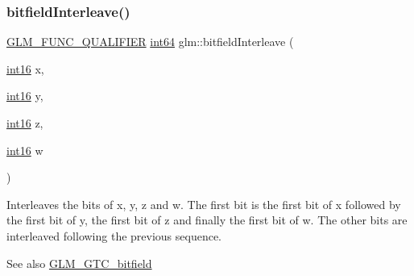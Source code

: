 \subsubsection{\texorpdfstring{bitfield\+Interleave()}{bitfieldInterleave()}\hspace{0.1cm}{\footnotesize\ttfamily [15/16]}}
{\footnotesize\ttfamily \hyperlink{setup_8hpp_a33fdea6f91c5f834105f7415e2a64407}{G\+L\+M\+\_\+\+F\+U\+N\+C\+\_\+\+Q\+U\+A\+L\+I\+F\+I\+ER} \hyperlink{group__gtc__type__precision_ga435d75819cce297cc5fa21bd84ef89a5}{int64} glm\+::bitfield\+Interleave (\begin{DoxyParamCaption}\item[{\hyperlink{group__gtc__type__precision_ga2945a61d12771f8954994fcddf02b021}{int16}}]{x,  }\item[{\hyperlink{group__gtc__type__precision_ga2945a61d12771f8954994fcddf02b021}{int16}}]{y,  }\item[{\hyperlink{group__gtc__type__precision_ga2945a61d12771f8954994fcddf02b021}{int16}}]{z,  }\item[{\hyperlink{group__gtc__type__precision_ga2945a61d12771f8954994fcddf02b021}{int16}}]{w }\end{DoxyParamCaption})}

Interleaves the bits of x, y, z and w. The first bit is the first bit of x followed by the first bit of y, the first bit of z and finally the first bit of w. The other bits are interleaved following the previous sequence.

\begin{DoxySeeAlso}{See also}
\hyperlink{group__gtc__bitfield}{G\+L\+M\+\_\+\+G\+T\+C\+\_\+bitfield} 
\end{DoxySeeAlso}
\mbox{\label{group__gtc__bitfield_gac8a926a7bfd9b23c22a4f685193fbfe1}} 
